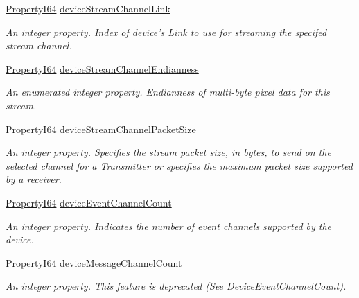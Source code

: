 \begin{DoxyCompactItemize}
\hyperlink{group___common_interface_ga81749b2696755513663492664a18a893}{Property\+I64} \hyperlink{classmv_i_m_p_a_c_t_1_1acquire_1_1_gen_i_cam_1_1_device_control_a99b4cbc9d0b74a503923a747c86d08b7}{device\+Stream\+Channel\+Link}
\begin{DoxyCompactList}\small\item\em An integer property. Index of device's Link to use for streaming the specifed stream channel. \end{DoxyCompactList}\item 
\hyperlink{group___common_interface_ga81749b2696755513663492664a18a893}{Property\+I64} \hyperlink{classmv_i_m_p_a_c_t_1_1acquire_1_1_gen_i_cam_1_1_device_control_a33540ea3ea9d775da3b88d3cde9d12f3}{device\+Stream\+Channel\+Endianness}
\begin{DoxyCompactList}\small\item\em An enumerated integer property. Endianness of multi-\/byte pixel data for this stream. \end{DoxyCompactList}\item 
\hyperlink{group___common_interface_ga81749b2696755513663492664a18a893}{Property\+I64} \hyperlink{classmv_i_m_p_a_c_t_1_1acquire_1_1_gen_i_cam_1_1_device_control_a8a8350b203c1ac3603588e4185dd56d0}{device\+Stream\+Channel\+Packet\+Size}
\begin{DoxyCompactList}\small\item\em An integer property. Specifies the stream packet size, in bytes, to send on the selected channel for a Transmitter or specifies the maximum packet size supported by a receiver. \end{DoxyCompactList}\item 
\hyperlink{group___common_interface_ga81749b2696755513663492664a18a893}{Property\+I64} \hyperlink{classmv_i_m_p_a_c_t_1_1acquire_1_1_gen_i_cam_1_1_device_control_aa5fcd8c9da11cc57e21379adec8f3b4e}{device\+Event\+Channel\+Count}
\begin{DoxyCompactList}\small\item\em An integer property. Indicates the number of event channels supported by the device. \end{DoxyCompactList}\item 
\hyperlink{group___common_interface_ga81749b2696755513663492664a18a893}{Property\+I64} \hyperlink{classmv_i_m_p_a_c_t_1_1acquire_1_1_gen_i_cam_1_1_device_control_a5e73c3db7079302dfd97230cc3220bc7}{device\+Message\+Channel\+Count}
\begin{DoxyCompactList}\small\item\em An integer property. This feature is deprecated (See Device\+Event\+Channel\+Count). \end{DoxyCompactList}\item 

\end{DoxyCompactItemize}
